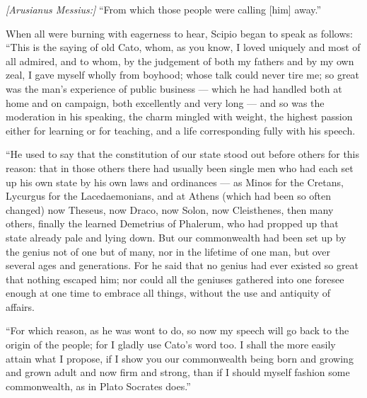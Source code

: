  \textit{[Arusianus Messius:]} ``From which those people were calling [him] away.''


 When all were burning with eagerness to hear, Scipio began to speak as follows: ``This is the saying of old Cato, whom, as you know, I loved uniquely and most of all admired, and to whom, by the judgement of both my fathers and by my own zeal, I gave myself wholly from boyhood; whose talk could never tire me; so great was the man's experience of public business --- which he had handled both at home and on campaign, both excellently and very long --- and so was the moderation in his speaking, the charm mingled with weight, the highest passion either for learning or for teaching, and a life corresponding fully with his speech.

 ``He used to say that the constitution of our state stood out before others for this reason: that in those others there had usually been single men who had each set up his own state by his own laws and ordinances --- as Minos for the Cretans, Lycurgus for the Lacedaemonians, and at Athens (which had been so often changed) now Theseus, now Draco, now Solon, now Cleisthenes, then many others, finally the learned Demetrius of Phalerum, who had propped up that state already pale and lying down. But our commonwealth had been set up by the genius not of one but of many, nor in the lifetime of one man, but over several ages and generations. For he said that no genius had ever existed so great that nothing escaped him; nor could all the geniuses gathered into one foresee enough at one time to embrace all things, without the use and antiquity of affairs.

 ``For which reason, as he was wont to do, so now my speech will go back to the origin of the people; for I gladly use Cato's word too. I shall the more easily attain what I propose, if I show you our commonwealth being born and growing and grown adult and now firm and strong, than if I should myself fashion some commonwealth, as in Plato Socrates does.''


